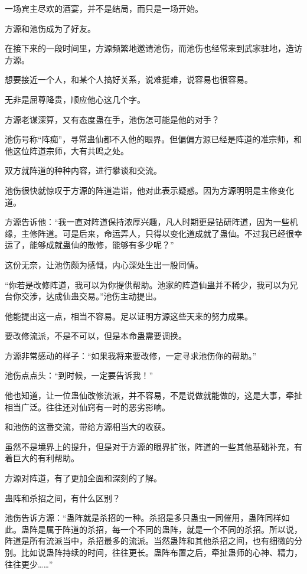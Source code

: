 
\begin{this_body}

一场宾主尽欢的酒宴，并不是结局，而只是一场开始。

方源和池伤成为了好友。

在接下来的一段时间里，方源频繁地邀请池伤，而池伤也经常来到武家驻地，造访方源。

想要接近一个人，和某个人搞好关系，说难挺难，说容易也很容易。

无非是屈尊降贵，顺应他心这几个字。

方源老谋深算，又有态度蛊在手，池伤怎可能是他的对手？

池伤号称“阵痴”，寻常蛊仙都不入他的眼界。但偏偏方源已经是阵道的准宗师，和他这位阵道宗师，大有共鸣之处。

双方就阵道的种种内容，进行攀谈和交流。

池伤很快就惊叹于方源的阵道造诣，他对此表示疑惑。因为方源明明是主修变化道。

方源告诉他：“我一直对阵道保持浓厚兴趣，凡人时期更是钻研阵道，因为一些机缘，主修阵道。可是后来，命运弄人，只得以变化道成就了蛊仙。不过我已经很幸运了，能够成就蛊仙的散修，能够有多少呢？”

这份无奈，让池伤颇为感慨，内心深处生出一股同情。

“你若是改修阵道，我可以为你提供帮助。池家的阵道仙蛊并不稀少，我可以为兄台你交涉，达成仙蛊交易。”池伤主动提出。

他能提出这一点，相当不容易。足以证明方源这些天来的努力成果。

要改修流派，不是不可以，但是本命蛊需要调换。

方源非常感动的样子：“如果我将来要改修，一定寻求池伤你的帮助。”

池伤点点头：“到时候，一定要告诉我！”

他也知道，让一位蛊仙改修流派，并不容易，不是说做就能做的，这是大事，牵扯相当广泛。往往还对仙窍有一时的恶劣影响。

和池伤的这番交流，带给方源相当大的收获。

虽然不是境界上的提升，但是对于方源的眼界扩张，阵道的一些其他基础补充，有着巨大的有利帮助。

方源对阵道，有了更加全面和深刻的了解。

蛊阵和杀招之间，有什么区别？

池伤告诉方源：“蛊阵就是杀招的一种。杀招是多只蛊虫一同催用，蛊阵同样如此。蛊阵是属于阵道的杀招，每一个不同的蛊阵，就是一个不同的杀招。所以说，阵道是所有流派当中，杀招最多的流派。当然蛊阵和其他杀招之间，也有细微的分别。比如说蛊阵持续的时间，往往更长。蛊阵布置之后，牵扯蛊师的心神、精力，往往更少……”


\end{this_body}
